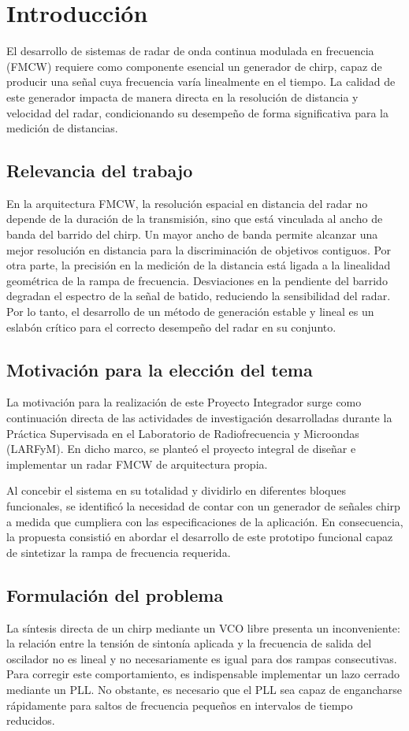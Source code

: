 \chapter{Introducción}
El desarrollo de sistemas de radar de onda continua modulada en frecuencia (FMCW) requiere como componente esencial un generador de chirp, capaz de producir una señal cuya frecuencia varía linealmente en el tiempo. La calidad de este generador impacta de manera directa en la resolución de distancia y velocidad del radar, condicionando su desempeño de forma significativa para la medición de distancias.

\section{Relevancia del trabajo}
En la arquitectura FMCW, la resolución espacial en distancia del radar no depende de la duración de la transmisión, sino que está vinculada al ancho de banda del barrido del chirp. Un mayor ancho de banda permite alcanzar una mejor resolución en distancia para la discriminación de objetivos contiguos. Por otra parte, la precisión en la medición de la distancia está ligada a la linealidad geométrica de la rampa de frecuencia. Desviaciones en la pendiente del barrido degradan el espectro de la señal de batido, reduciendo la sensibilidad del radar. Por lo tanto, el desarrollo de un método de generación estable y lineal es un eslabón crítico para el correcto desempeño del radar en su conjunto.

\section{Motivación para la elección del tema}
La motivación para la realización de este Proyecto Integrador surge como continuación directa de las actividades de investigación desarrolladas durante la Práctica Supervisada en el Laboratorio de Radiofrecuencia y Microondas (LARFyM). En dicho marco, se planteó el proyecto integral de diseñar e implementar un radar FMCW de arquitectura propia. 

Al concebir el sistema en su totalidad y dividirlo en diferentes bloques funcionales, se identificó la necesidad de contar con un generador de señales chirp a medida que cumpliera con las especificaciones de la aplicación. En consecuencia, la propuesta consistió en abordar el desarrollo de este prototipo funcional capaz de sintetizar la rampa de frecuencia requerida.

\section{Formulación del problema}
La síntesis directa de un chirp mediante un VCO libre presenta un inconveniente: la relación entre la tensión de sintonía aplicada y la frecuencia de salida del oscilador no es lineal y no necesariamente es igual para dos rampas consecutivas. Para corregir este comportamiento, es indispensable implementar un lazo cerrado mediante un PLL. No obstante, es necesario que el PLL sea capaz de engancharse rápidamente para saltos de frecuencia pequeños en intervalos de tiempo reducidos. 

